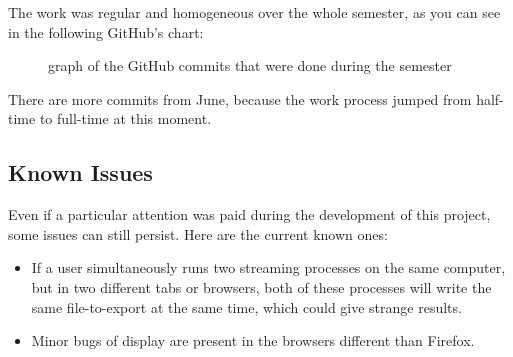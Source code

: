 \documentclass[a4paper,11pt]{report}
\begin{document}
The work was regular and homogeneous over the whole semester, as you can see in the following GitHub's chart:
\begin{figure}[H]
\vspace{-5pt}
\begin{center}
\vspace{-20pt}
\caption{graph of the GitHub commits that were done during the semester}
\end{center}
\end{figure}
\vspace{-10pt}

There are more commits from June, because the work process jumped from half-time to full-time at this moment.
\bigskip

\subsection{Known Issues}
Even if a particular attention was paid during the development of this project, some issues can still persist. Here are the current known ones:
\begin{itemize}
	\item If a user simultaneously runs two streaming processes on the same computer, but in two different tabs or browsers, both of these processes will write the same file-to-export at the same time, which could give strange results.
	\item Minor bugs of display are present in the browsers different than Firefox.
\end{itemize}
\newpage
\end{document}
